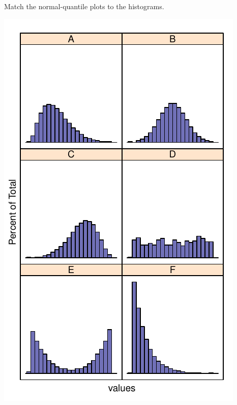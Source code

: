 \documentclass[twoside]{book}\usepackage[]{graphicx}\usepackage[]{xcolor}
\makeatletter
\def\maxwidth{ %
  \ifdim\Gin@nat@width>\linewidth
    \linewidth
  \else
    \Gin@nat@width
  \fi
}
\newenvironment{knitrout}{}{} %
\makeatother
\begin{document}
\begin{problem}
	Match the normal-quantile plots to the histograms.


\begin{knitrout}
\color{fgcolor}

{\centering \includegraphics[width=\maxwidth]{figures/fig-compareplots1-1} 
}
\end{knitrout}
\end{problem}
\end{document}

